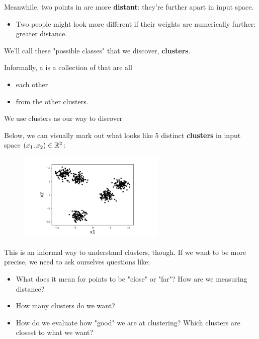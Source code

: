             
        Meanwhile, two points in  are more \textbf{distant}: they're further apart in input space. 

        \begin{itemize}
            \item \miniex Two people might look more different if their weights are numerically further: greater distance.
        \end{itemize}

        
        We'll call these "possible classes" that we discover, \textbf{clusters}.\\
        
        \begin{definition}
            Informally, a  is a collection of  that are all 
            \begin{itemize}
                \item {} each other
                
                \item {} from the other clusters.
            \end{itemize}
            
            We use clusters as our way to discover 
        \end{definition}
        
        \miniex Below, we can visually mark out what looks like 5 distinct \textbf{clusters} in input space $(x_1,x_2) \in \mathbb R^2$:
        
        \begin{figure}[H]
            \centering
            \includegraphics[width=70mm,scale=0.4]{images/clustering_images/clustering_example.png}
        \end{figure}
        
        This is an informal way to understand clusters, though. If we want to be more precise, we need to ask ourselves questions like:
        
        \begin{itemize}
            \item What does it mean for points to be "close" or "far"? How are we measuring distance?
            
            \item How many clusters do we want?
            
            \item How do we evaluate how "good" we are at clustering? Which clusters are closest to what we want?
        \end{itemize}
        
